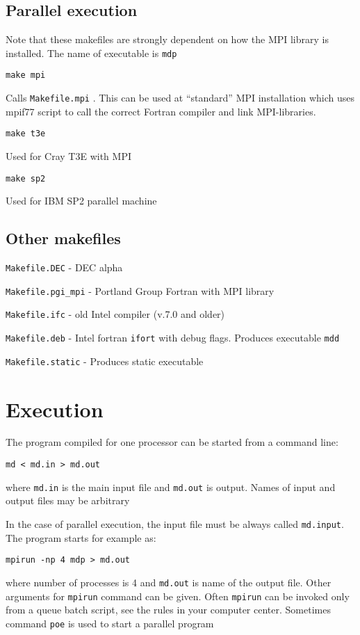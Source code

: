 \documentclass{article}
\begin{document}
\subsection{Parallel execution} 

Note that these makefiles are strongly dependent on how
the MPI library is installed. The name of executable is \verb|mdp|

\verb|make mpi|

Calls   \verb|Makefile.mpi| .  This can be used at ``standard'' MPI 
installation which uses mpif77 script to call the correct Fortran
compiler and link MPI-libraries. 

\verb|make t3e|  

Used for Cray T3E with MPI

\verb|make sp2| 

Used for  IBM SP2 parallel machine


\subsection{Other makefiles}

\indent
\verb|Makefile.DEC| - DEC alpha
  
\verb|Makefile.pgi_mpi| -  Portland Group Fortran with MPI library

\verb|Makefile.ifc| -  old Intel compiler (v.7.0 and older)
		  
\verb|Makefile.deb| - Intel fortran \verb|ifort| with debug flags. 
Produces executable \verb|mdd|

\verb|Makefile.static| - Produces static executable


\section{Execution}

The program compiled for one processor can be started from a command line:

\verb|md < md.in > md.out|

where \verb|md.in| is the main input file and \verb|md.out| is output. Names
of input and output files may be arbitrary

In the case of parallel execution, the input file must be always called 
\verb|md.input|. The program starts for example as:

\verb|mpirun -np 4 mdp > md.out|

where number of processes is 4 and \verb|md.out| is name of the output file.
Other arguments for \verb|mpirun| command can be given. Often 
\verb|mpirun| can be invoked only from a queue batch script, see
the rules in your computer center. Sometimes command \verb|poe| is used
to start a parallel program
\end{document}
